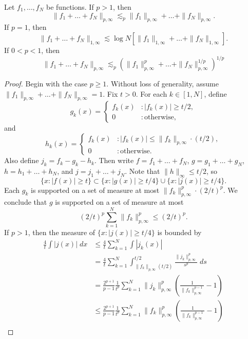 \begin{theorem}
  Let $f_1, \dots, f_N$ be functions. If $p > 1$, then
  \[ \| f_1 + \dots + f_N \|_{p,\infty} \lesssim_p \| f_1 \|_{p,\infty} + \dots + \| f_N \|_{p,\infty}. \]
  If $p = 1$, then
  \[ \| f_1 + \dots + f_N \|_{1,\infty} \lesssim \log N \left[ \| f_1 \|_{1,\infty} + \dots + \| f_N \|_{1,\infty} \right]. \]
  If $0 < p < 1$, then
  \[ \| f_1 + \dots + f_N \|_{p,\infty} \lesssim_p \left( \| f_1 \|_{p,\infty}^p + \dots + \| f_N \|_{p,\infty}^{1/p} \right)^{1/p} \]
\end{theorem}
\begin{proof}
    Begin with the case $p \geq 1$. Without loss of generality, assume $\| f_1 \|_{p,\infty} + \dots + \| f_N \|_{p,\infty} = 1$. Fix $t > 0$. For each $k \in [1,N]$, define
    \[ g_k(x) = \begin{cases} f_k(x) &: |f_k(x)| \geq t/2, \\ 0 &: \text{otherwise}, \end{cases} \]
    and
    \[ h_k(x) = \begin{cases} f_k(x) &: |f_k(x)| \leq \| f_k \|_{p,\infty} \cdot (t/2), \\ 0 &: \text{otherwise}. \end{cases} \]
    Also define $j_k = f_k - g_k - h_k$. Then write $f = f_1 + \dots + f_N$, $g = g_1 + \dots + g_N$, $h = h_1 + \dots + h_N$, and $j = j_1 + \dots + j_N$. Note that $\| h \|_\infty \leq t/2$, so
    \[ \{ x : |f(x)| \geq t \} \subset \{ x : |g(x)| \geq t/4 \} \cup \{ x : |j(x)| \geq t/4 \}. \]
    Each $g_k$ is supported on a set of measure at most $\| f_k \|_{p,\infty}^p \cdot (2/t)^p$. We conclude that $g$ is supported on a set of measure at most
    \[ (2/t)^p \sum_{k = 1}^N \| f_k \|_{p,\infty}^p \leq (2/t)^p. \]
    If $p > 1$, then the measure of $\{ x : |j(x)| \geq t/4 \}$ is bounded by
    \begin{align*}
        \frac{4}{t} \int |j(x)|\; dx &\leq \frac{4}{t} \sum_{k = 1}^N \int |j_k(x)|\\
        &= \frac{4}{t} \sum_{k = 1}^N \int_{\| f_k \|_{p,\infty} (t/2)}^{t/2} \frac{\| j_k \|_{p,\infty}^p}{s^p}\; ds\\
        &= \frac{2^{p+1}}{p-1} \frac{1}{t^p} \sum_{k = 1}^N \| j_k \|_{p,\infty}^p \left( \frac{1}{\| f_k \|_{p,\infty}^{p-1}} - 1 \right) \\
        &\leq \frac{2^{p+1}}{p-1} \frac{1}{t^p} \sum_{k = 1}^N \| f_k \|_{p,\infty}^p \left( \frac{1}{\| f_k \|_{p,\infty}^{p-1 }} - 1 \right)\\

\end{align*}
\end{proof}
